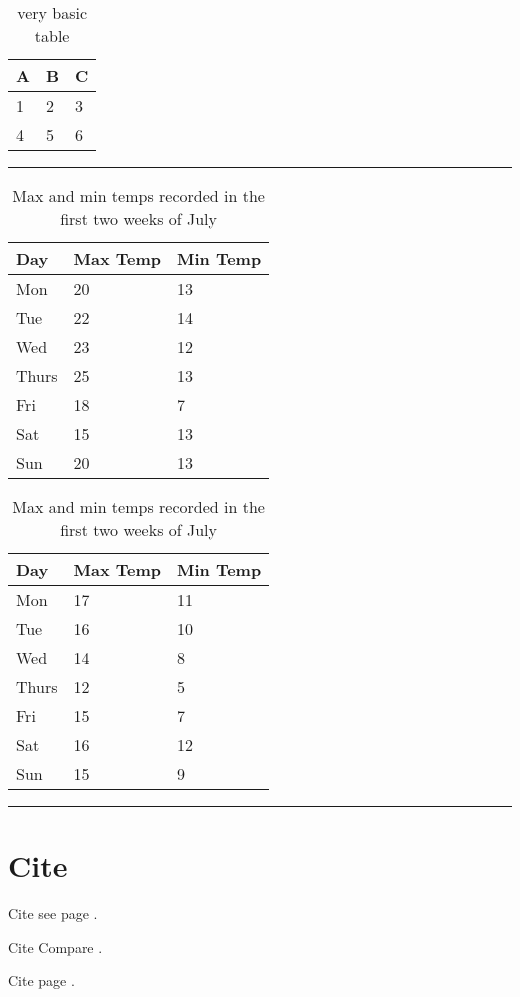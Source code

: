     \begin{table}[ht]
    \centering
    \begin{tabular}{l | l | l}
    A & B & C \\
    \hline
    1 & 2 & 3 \\
    4 & 5 & 6
    \end{tabular}
    \caption{very basic table}
    \label{tab:abc}
\end{table}
\hrule
\begin{table}[ht]
    \begin{subtable}[h]{0.45\textwidth}
        \centering
        \begin{tabular}{l | l | l}
        Day & Max Temp & Min Temp \\
        \hline \hline
        Mon & 20 & 13\\
        Tue & 22 & 14\\
        Wed & 23 & 12\\
        Thurs & 25 & 13\\
        Fri & 18 & 7\\
        Sat & 15 & 13\\
        Sun & 20 & 13
        \end{tabular}
        \caption{First Week}
        \label{tab:week1}
    \end{subtable}
    \hfill
    \begin{subtable}[h]{0.45\textwidth}
        \centering
        \begin{tabular}{l | l | l}
        Day & Max Temp & Min Temp \\
        \hline \hline
        Mon & 17 & 11\\
        Tue & 16 & 10\\
        Wed & 14 & 8\\
        Thurs & 12 & 5\\
        Fri & 15 & 7\\
        Sat & 16 & 12\\
        Sun & 15 & 9
        \end{tabular}
        \caption{Second Week}
        \label{tab:week2}
    \end{subtable}
    \caption{Max and min temps recorded in the first two weeks of July}
    \label{tab:temps}
\end{table}

\hrule


\section{Cite}

Cite see page \parencite[see][p10]{latexcompanion}.

Cite Compare \parencite[compare][]{knuthwebsite}.


Cite page \parencite[e.g.][page 300]{einstein}.
